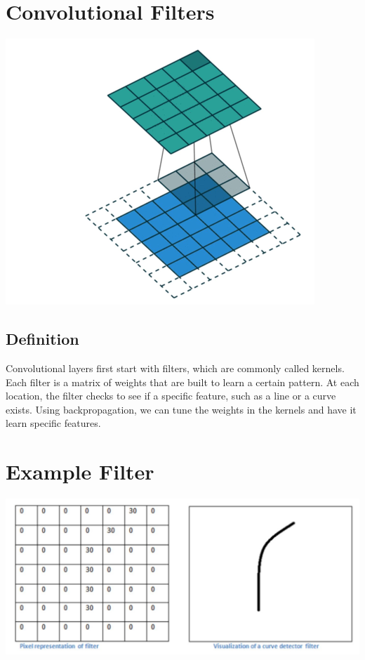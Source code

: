 \documentclass{article}
\begin{document}
\section{Convolutional Filters}
\begin{center}
\includegraphics[scale=0.5]{convgif}
\end{center}
\subsection{Definition}
Convolutional layers first start with filters, which are commonly called kernels. Each filter is a matrix of weights that are built to learn a certain pattern. At each location, the filter checks to see if a specific feature, such as a line or a curve exists. Using backpropagation, we can tune the weights in the kernels and have it learn specific features.

\section{Example Filter}
\begin{center}
\includegraphics[scale=0.5]{filter}
\end{center}
\end{document}
